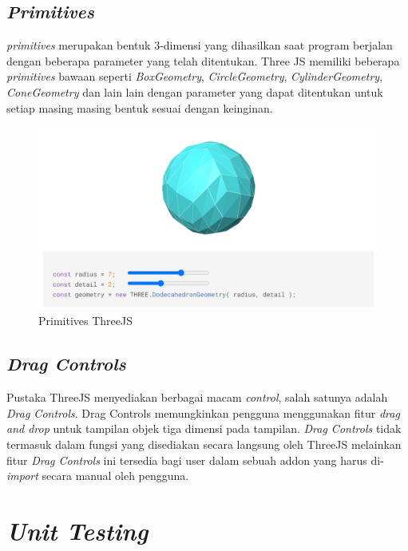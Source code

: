 \subsection{\emph{Primitives}}
\textit{primitives} merupakan bentuk 3-dimensi yang dihasilkan saat program berjalan dengan beberapa parameter yang telah ditentukan. Three JS memiliki beberapa \textit{primitives} bawaan seperti \textit{BoxGeometry}, \textit{CircleGeometry}, \textit{CylinderGeometry}, \textit{ConeGeometry} dan lain lain dengan parameter yang dapat ditentukan untuk setiap masing masing bentuk sesuai dengan keinginan. 

\begin{figure}[H]
	\centering
	\includegraphics[keepaspectratio, width=12cm]{gambar/three-js-geometry-example.png}
	\caption{Primitives ThreeJS}
	\label{gambar:three-js-geometry-example.png}
\end{figure}

\subsection{\emph{Drag Controls}}
Pustaka ThreeJS menyediakan berbagai macam \textit{control}, salah satunya adalah \textit{Drag Controls}. Drag Controls memungkinkan pengguna menggunakan fitur \textit{drag and drop} untuk tampilan objek tiga dimensi pada tampilan. \textit{Drag Controls} tidak termasuk dalam fungsi yang disediakan secara langsung oleh ThreeJS melainkan fitur \textit{Drag Controls} ini tersedia bagi user dalam sebuah addon yang harus di-\textit{import} secara manual oleh pengguna.


\section{\textit{Unit Testing}}


